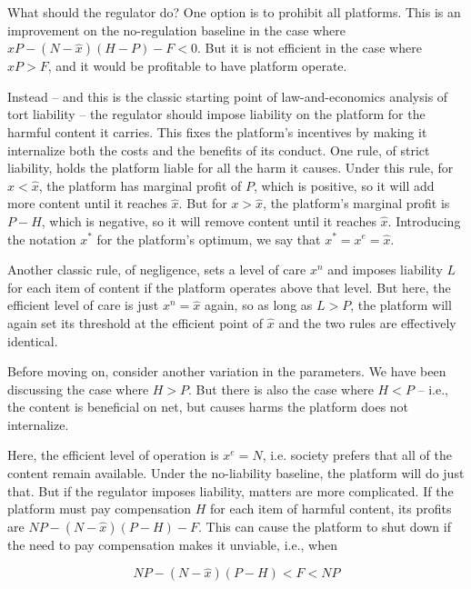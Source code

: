 What should the regulator do? One option is to prohibit all platforms. This is an improvement on the no-regulation baseline in the case where $\hat{x}P - (N - \hat{x})(H - P) - F < 0$. But it is not efficient in the case where $\hat{x}P > F$, and it would be profitable to have  platform operate.

Instead -- and this is the classic starting point of law-and-economics analysis of tort liability -- the regulator should impose liability on the platform for the harmful content it carries. This fixes the platform's incentives by making it internalize both the costs and the benefits of its conduct. One rule, of strict liability, holds the platform liable for all the harm it causes. Under this rule, for $x <\hat{x}$, the platform has marginal profit of $P$, which is positive, so it will add more content until it reaches $\hat{x}$. But for $x > \hat{x}$, the platform's marginal profit is $P - H$, which is negative, so it will remove content until it reaches $\hat{x}$.  Introducing the notation $x^*$ for the platform's optimum, we say that $x^* = x^e = \hat{x}$.

Another classic rule, of negligence, sets a level of care $x^n$ and imposes liability $L$ for each item of content if the platform operates above that level. But here, the efficient level of care is just $x^n = \hat{x}$ again, so as long as $L>P$, the platform will again set its threshold at the efficient point of $\hat{x}$ and the two rules are effectively identical.

Before moving on, consider another variation in the parameters. We have been discussing the case where $H > P$. But there is also the case where $H < P$ -- i.e., the content is beneficial on net, but causes harms the platform does not internalize.


Here, the efficient level of operation is $x^e = N$, i.e. society prefers that all of the content remain available. Under the no-liability baseline, the platform will do just that. But if the regulator imposes liability, matters are more complicated. If the platform must pay compensation $H$ for each item of harmful content, its profits are $NP - (N - \hat{x})(P - H) - F $. This can cause the platform to shut down if the need to pay compensation makes it unviable, i.e., when 

\begin{equation}
NP - (N - \hat{x})(P - H) < F <  NP
\end{equation}

